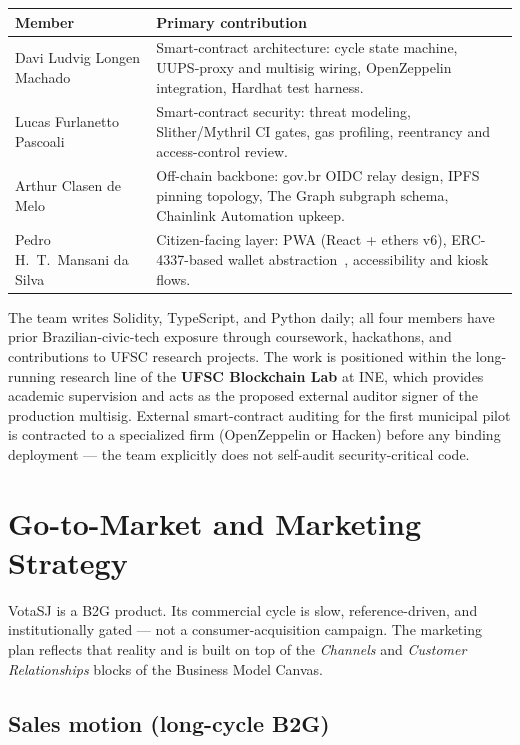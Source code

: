 \documentclass[12pt]{article}
\begin{document}
\begin{center}
\begin{tabular}{l p{}}
\toprule
\textbf{Member} & \textbf{Primary contribution} \\
\midrule
Davi Ludvig Longen Machado & Smart-contract architecture: cycle state machine, UUPS-proxy and multisig wiring, OpenZeppelin integration, Hardhat test harness. \\
Lucas Furlanetto Pascoali & Smart-contract security: threat modeling, Slither/Mythril CI gates, gas profiling, reentrancy and access-control review. \\
Arthur Clasen de Melo & Off-chain backbone: gov.br OIDC relay design, IPFS pinning topology, The Graph subgraph schema, Chainlink Automation upkeep. \\
Pedro H.\ T.\ Mansani da Silva & Citizen-facing layer: PWA (React + ethers v6), ERC-4337-based wallet abstraction~\cite{eip4337}, accessibility and kiosk flows. \\
\bottomrule
\end{tabular}
\end{center}

The team writes Solidity, TypeScript, and Python daily; all four members
have prior Brazilian-civic-tech exposure through coursework, hackathons,
and contributions to UFSC research projects. The work is positioned within
the long-running research line of the \textbf{UFSC Blockchain Lab} at INE,
which provides academic supervision and acts as the proposed external
auditor signer of the production multisig. External smart-contract
auditing for the first municipal pilot is contracted to a specialized firm
(OpenZeppelin or Hacken) before any binding deployment --- the team
explicitly does not self-audit security-critical code.

\section{Go-to-Market and Marketing Strategy}
\label{sec:gtm}

VotaSJ is a B2G product. Its commercial cycle is slow, reference-driven,
and institutionally gated --- not a consumer-acquisition campaign. The
marketing plan reflects that reality and is built on top of the
\emph{Channels} and \emph{Customer Relationships} blocks of the Business
Model Canvas.

\subsection{Sales motion (long-cycle B2G)}
\end{document}
